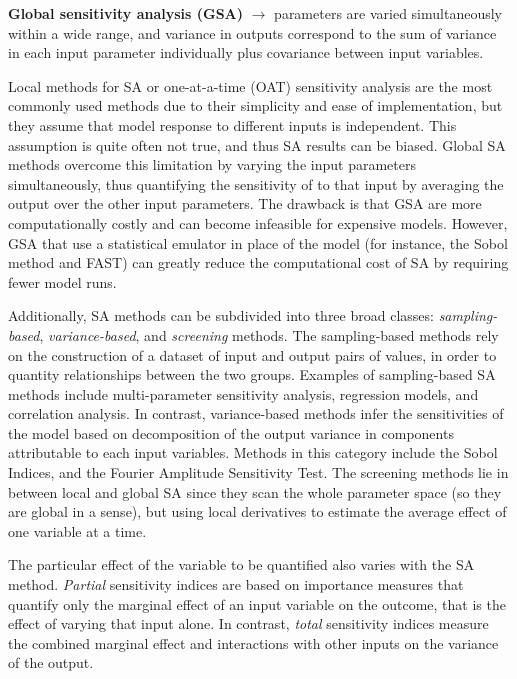 \documentclass[12pt]{article}
\begin{document}
\textbf{Global sensitivity analysis (GSA)} $\rightarrow$ parameters are varied simultaneously within a wide range, and variance in outputs correspond to the sum of variance in each input parameter individually plus covariance between input variables. 

\vspace{0.5cm}

Local methods for SA or one-at-a-time  (OAT) sensitivity analysis are the most commonly used methods due to their simplicity and ease of implementation, but they assume that model response to different inputs is independent. This assumption is quite often not true, and thus SA results can be biased. Global SA methods overcome this limitation by varying the input parameters simultaneously, thus quantifying the sensitivity of to that input by averaging the output over the other input parameters. The drawback is that GSA are more computationally costly and can become infeasible for expensive models. However, GSA that use a statistical emulator in place of the model (for instance, the Sobol method and FAST) can greatly reduce the computational cost of SA by requiring fewer model runs. 

Additionally, SA methods can  be subdivided into three broad classes: \textit{sampling-based}, \textit{variance-based}, and \textit{screening} methods. The sampling-based methods rely on the construction of a dataset of input and output pairs of values, in order to quantity relationships between the two groups. Examples of sampling-based SA methods include multi-parameter sensitivity analysis, regression models, and correlation analysis. In contrast, variance-based methods infer the sensitivities of the model based on decomposition of the output variance in components attributable to each input variables. Methods in this category include the Sobol Indices, and the Fourier Amplitude Sensitivity Test. The screening methods lie in between local and global SA since they scan the whole parameter space (so they are global in a sense), but using local derivatives to estimate the average effect of one variable at a time.

The particular effect of the variable to be quantified also varies with the SA method. \textit{Partial} sensitivity indices are based on importance measures that quantify only the marginal effect of an input variable on the outcome, that is the effect of varying that input alone. In contrast, \textit{total} sensitivity indices measure the combined marginal effect and interactions with other inputs on the variance of the output. 
\end{document}
